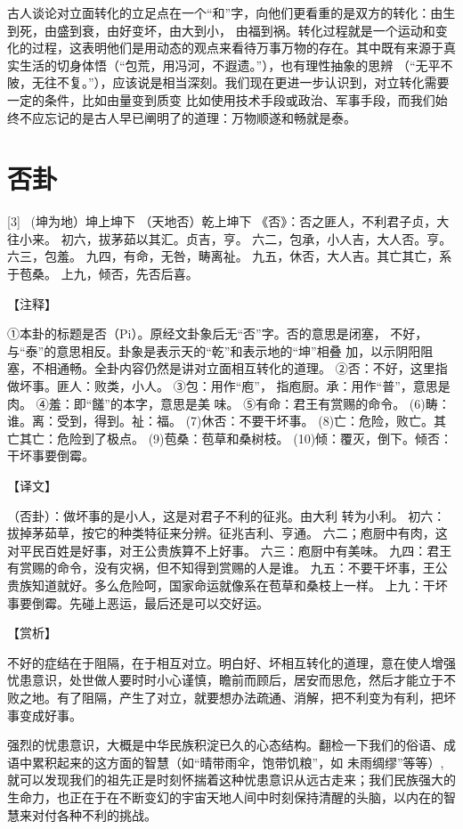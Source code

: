 \documentclass[12pt,UTF8]{ctexbook}
\begin{document}
古人谈论对立面转化的立足点在一个“和”字，向他们更看重的是双方的转化：由生到死，由盛到衰，由好变坏，由大到小， 由福到祸。转化过程就是一个运动和变化的过程，这表明他们是用动态的观点来看待万事万物的存在。其中既有来源于真实生活的切身体悟（“包荒，用冯河，不遐遗。”），也有理性抽象的思辨 （“无平不陂，无往不复。”），应该说是相当深刻。我们现在更进一步认识到，对立转化需要一定的条件，比如由量变到质变 比如使用技术手段或政治、军事手段，而我们始终不应忘记的是古人早已阐明了的道理：万物顺遂和畅就是泰。

\chapter{否卦}
[3] \ (坤为地）坤上坤下
（天地否）乾上坤下
《否》：否之匪人，不利君子贞，大往小来。
初六，拔茅茹以其汇。贞吉，亨。
六二，包承，小人吉，大人否。亨。
六三，包羞。
九四，有命，无咎，畴离祉。
九五，休否，大人吉。其亡其亡，系于苞桑。
上九，倾否，先否后喜。

【注释】

①本卦的标题是否（Pi）。原经文卦象后无“否”字。否的意思是闭塞， 不好，与“泰”的意思相反。卦象是表示天的“乾”和表示地的“坤”相叠 加，以示阴阳阻塞，不相通畅。全卦内容仍然是讲对立面相互转化的道理。
②否：不好，这里指做坏事。匪人：败类，小人。
③包：用作“庖”， 指庖厨。承：用作“普”，意思是肉。
④羞：即“饈”的本字，意思是美 味。
⑤有命：君王有赏赐的命令。
(6)畴：谁。离：受到，得到。祉：福。
(7)休否：不要干坏事。
(8)亡：危险，败亡。其亡其亡：危险到了极点。
(9)苞桑：苞草和桑树枝。
(10)倾：覆灭，倒下。倾否：干坏事要倒霉。

【译文】

（否卦）：做坏事的是小人，这是对君子不利的征兆。由大利 转为小利。
初六：拔掉茅茹草，按它的种类特征来分辨。征兆吉利、亨通。
六二；庖厨中有肉，这对平民百姓是好事，对王公贵族算不上好事。
六三：庖厨中有美味。
九四：君王有赏赐的命令，没有灾祸，但不知得到赏赐的人是谁。
九五：不要干坏事，王公贵族知道就好。多么危险呵，国家命运就像系在苞草和桑枝上一样。
上九：干坏事要倒霉。先碰上恶运，最后还是可以交好运。

【赏析】

不好的症结在于阻隔，在于相互对立。明白好、坏相互转化的道理，意在使人增强忧患意识，处世做人要时时小心谨慎，瞻前而顾后，居安而思危，然后才能立于不败之地。有了阻隔，产生了对立，就要想办法疏通、消解，把不利变为有利，把坏事变成好事。

强烈的忧患意识，大概是中华民族积淀已久的心态结构。翻检一下我们的俗语、成语中累积起来的这方面的智慧（如“晴带雨伞，饱带饥粮”，如 未雨绸缪”等等）, 就可以发现我们的祖先正是时刻怀揣着这种忧患意识从远古走来；我们民族强大的生命力，也正在于在不断变幻的宇宙天地人间中时刻保持清醒的头脑，以内在的智慧来对付各种不利的挑战。
\end{document}
